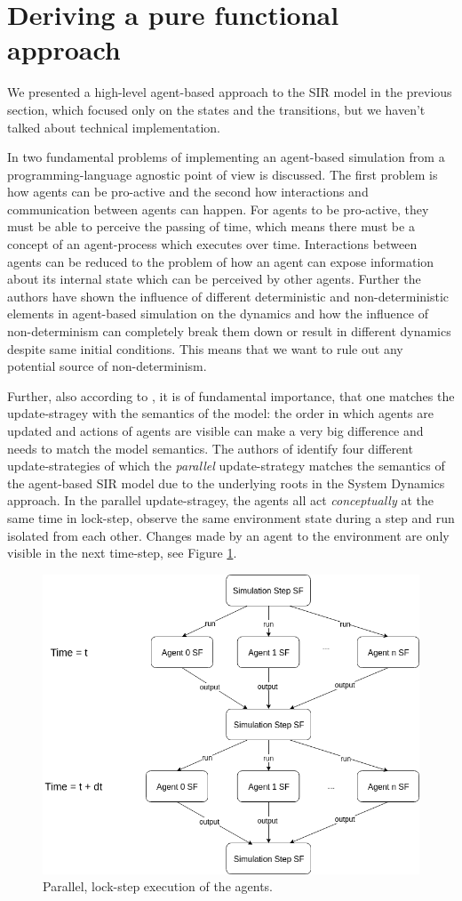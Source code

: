 \section{Deriving a pure functional approach}
\label{sec:functional_approach}

We presented a high-level agent-based approach to the SIR model in the previous section, which focused only on the states and the transitions, but we haven't talked about technical implementation. 

In \cite{thaler_art_2017} two fundamental problems of implementing an agent-based simulation from a programming-language agnostic point of view is discussed. The first problem is how agents can be pro-active and the second how interactions and communication between agents can happen. For agents to be pro-active, they must be able to perceive the passing of time, which means there must be a concept of an agent-process which executes over time. Interactions between agents can be reduced to the problem of how an agent can expose information about its internal state which can be perceived by other agents. Further the authors have shown the influence of different deterministic and non-deterministic elements in agent-based simulation on the dynamics and how the influence of non-determinism can completely break them down or result in different dynamics despite same initial conditions. This means that we want to rule out any potential source of non-determinism.

Further, also according to \cite{thaler_art_2017}, it is of fundamental importance, that one matches the update-stragey with the semantics of the model: the order in which agents are updated and actions of agents are visible can make a very big difference and needs to match the model semantics. The authors of \cite{thaler_art_2017} identify four different update-strategies of which the \textit{parallel} update-strategy matches the semantics of the agent-based SIR model due to the underlying roots in the System Dynamics approach. In the parallel update-stragey, the agents all act \textit{conceptually} at the same time in lock-step, observe the same environment state during a step and run isolated from each other. Changes made by an agent to the environment are only visible in the next time-step, see Figure \ref{fig:parallel_strategy}.

\begin{figure}
	\centering
	\includegraphics[width=.4\textwidth, angle=0]{./fig/diagrams/parallel_strategy.png}
	\caption{Parallel, lock-step execution of the agents.}
	\label{fig:parallel_strategy}
\end{figure}

